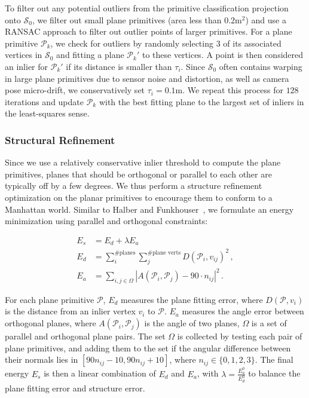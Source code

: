 To filter out any potential outliers from the primitive classification projection onto $\mathcal{S}_0$, we filter out small plane primitives (area less than $0.2$m$^2$) and use a RANSAC approach to filter out outlier points of larger primitives.
For a plane primitive $\mathcal{P}_k$, we check for outliers by randomly selecting $3$ of its associated vertices in $\mathcal{S}_0$ and fitting a plane $\mathcal{P}_k'$ to these vertices. 
A point is then considered an inlier for $\mathcal{P}_k'$ if its distance is smaller than $\tau_i$. 
Since $\mathcal{S}_0$ often contains warping in large plane primitives due to sensor noise and distortion, as well as camera pose micro-drift, we conservatively set $\tau_i = 0.1$m.
We repeat this process for $128$ iterations and update $\mathcal{P}_k$ with the best fitting plane to the largest set of inliers in the least-squares sense.

\subsubsection{Structural Refinement}
\label{sec:fit-refine}

Since we use a relatively conservative inlier threshold to compute the plane primitives, planes that should be orthogonal or parallel to each other are typically off by a few degrees.
We thus perform a structure refinement optimization on the planar primitives to encourage them to conform to a Manhattan world.
Similar to Halber and Funkhouser~\cite{halber2016fine}, we formulate an energy minimization using parallel and orthogonal constraints:

\begin{align}
    E_s &= E_d + \lambda E_a\, \\
    E_d &= \sum_{i}^{\#\textrm{planes}} \sum_{j}^{\#\textrm{plane verts}} D(\mathcal{P}_i,v_{ij})^2\,,\\
    E_a &= \sum_{i,j\in \Omega} |A(\mathcal{P}_i,\mathcal{P}_j)-90\cdot n_{ij}|^2\,.
\end{align}

For each plane primitive $\mathcal{P}$, $E_d$ measures the plane fitting error, where $D(\mathcal{P},v_i)$ is the distance from an inlier vertex $v_i$ to $\mathcal{P}$. 
$E_a$ measures the angle error between orthogonal planes, where $A(\mathcal{P}_i,\mathcal{P}_j)$ is the angle of two planes, $\Omega$ is a set of parallel and orthogonal plane pairs. 
The set $\Omega$ is collected by testing each pair of plane primitives, and adding them to the set if the angular difference between their normals lies in $[90n_{ij}-10, 90n_{ij}+10]$, where $n_{ij}\in \{0,1,2,3\}$. 
The final energy $E_s$ is then a linear combination of $E_d$ and $E_a$, with $\lambda=\frac{E_a^0}{E_d^0}$ to balance the plane fitting error and structure error.

